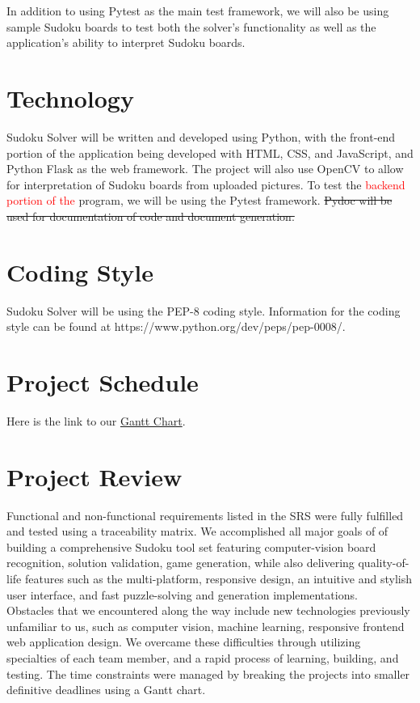 \documentclass[11pt]{article}
\begin{document}
In addition to using Pytest as the main test framework, we will also be using sample Sudoku boards to test both the solver's functionality as well as the application's ability to interpret Sudoku boards.

\section{Technology}

Sudoku Solver will be written and developed using Python, with the front-end portion of the application being developed with HTML, CSS, and JavaScript, and Python Flask as the web framework. The project will also use OpenCV to allow for interpretation of Sudoku boards from uploaded pictures. To test the \textcolor{red}{backend portion of the }program, we will be using the Pytest framework. \sout{Pydoc will be used for documentation of code and document generation.}

\section{Coding Style}

Sudoku Solver will be using the PEP-8 coding style. Information for the coding style can be found at https://www.python.org/dev/peps/pep-0008/. 

\section{Project Schedule}

Here is the link to our  \href{https://gitlab.cas.mcmaster.ca/bhuiyr2/sudokusolver_l02_grp08/-/blob/main/ProjectSchedule/Gantt_Sudoku.gan}{Gantt Chart}.

\section{Project Review}
Functional and non-functional requirements listed in the SRS were fully fulfilled and tested using a traceability matrix. We accomplished all major goals of of building a comprehensive Sudoku tool set featuring computer-vision board recognition, solution validation, game generation, while also delivering quality-of-life features such as the multi-platform, responsive design, an intuitive and stylish user interface, and fast puzzle-solving and generation implementations. \\

Obstacles that we encountered along the way include new technologies previously unfamiliar to us, such as computer vision, machine learning, responsive frontend web application design. We overcame these difficulties through utilizing specialties of each team member, and a rapid process of learning, building, and testing. The time constraints were managed by breaking the projects into smaller definitive deadlines using a Gantt chart.
\\
\end{document}
